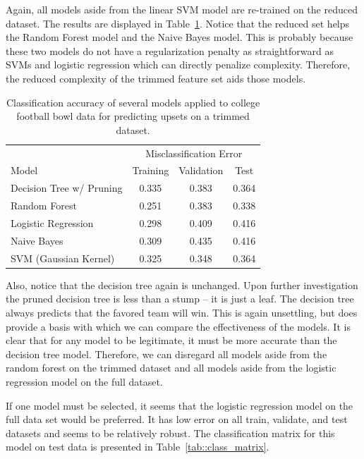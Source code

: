 \documentclass[12pt]{article}
\begin{document}
Again, all models aside from the linear SVM model are re-trained on the reduced dataset. The results are displayed in Table~\ref{tab::try_2_reduced}. Notice that the reduced set helps the Random Forest model and the Naive Bayes model. This is probably because these two models do not have a regularization penalty as straightforward as SVMs and logistic regression which can directly penalize complexity. Therefore, the reduced complexity of the trimmed feature set aids those models.
\begin{table}[ht!]
	\begin{center}
		\caption{Classification accuracy of several models applied to college football bowl data for predicting upsets on a trimmed dataset.}
		\label{tab::try_2_reduced}
		\begin{tabular}{l|ccc}
			\hline
			& \multicolumn{3}{c}{Misclassification Error} \\
			Model & Training & Validation & Test \\
			\hline
			Decision Tree w/ Pruning & 0.335 & 0.383 & 0.364\\
			Random Forest & 0.251 & 0.383 & 0.338\\
			Logistic Regression & 0.298 & 0.409 & 0.416\\
			Naive Bayes & 0.309 & 0.435 & 0.416\\
			SVM (Gaussian Kernel) & 0.325 & 0.348 & 0.364\\
			\hline
		\end{tabular}
	\end{center}
\end{table}

Also, notice that the decision tree again is unchanged. Upon further investigation the pruned decision tree is less than a stump -- it is just a leaf. The decision tree always predicts that the favored team will win. This is again unsettling, but does provide a basis with which we can compare the effectiveness of the models. It is clear that for any model to be legitimate, it must be more accurate than the decision tree model. Therefore, we can disregard all models aside from the random forest on the trimmed dataset and all models aside from the logistic regression model on the full dataset.

If one model must be selected, it seems that the logistic regression model on the full data set would be preferred. It has low error on all train, validate, and test datasets and seems to be relatively robust. The classification matrix for this model on test data is presented in Table~\ref{tab::class_matrix}.
\end{document}
